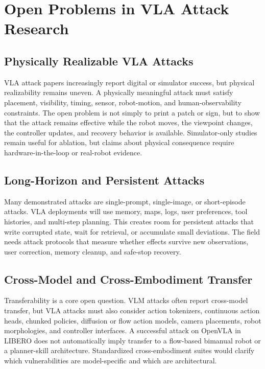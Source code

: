 \section{Open Problems in VLA Attack Research}
\label{sec:challenges}

\subsection{Physically Realizable VLA Attacks}

VLA attack papers increasingly report digital or simulator success, but physical realizability remains uneven. A physically meaningful attack must satisfy placement, visibility, timing, sensor, robot-motion, and human-observability constraints. The open problem is not simply to print a patch or sign, but to show that the attack remains effective while the robot moves, the viewpoint changes, the controller updates, and recovery behavior is available. Simulator-only studies remain useful for ablation, but claims about physical consequence require hardware-in-the-loop or real-robot evidence.

\subsection{Long-Horizon and Persistent Attacks}

Many demonstrated attacks are single-prompt, single-image, or short-episode attacks. VLA deployments will use memory, maps, logs, user preferences, tool histories, and multi-step planning. This creates room for persistent attacks that write corrupted state, wait for retrieval, or accumulate small deviations. The field needs attack protocols that measure whether effects survive new observations, user correction, memory cleanup, and safe-stop recovery.

\subsection{Cross-Model and Cross-Embodiment Transfer}

Transferability is a core open question. VLM attacks often report cross-model transfer, but VLA attacks must also consider action tokenizers, continuous action heads, chunked policies, diffusion or flow action models, camera placements, robot morphologies, and controller interfaces. A successful attack on OpenVLA in LIBERO does not automatically imply transfer to a flow-based bimanual robot or a planner-skill architecture. Standardized cross-embodiment suites would clarify which vulnerabilities are model-specific and which are architectural.

